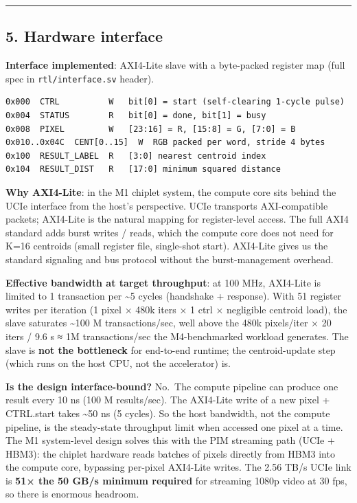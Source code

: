 \documentclass[
  10pt,
]{article}
\begin{document}
\begin{center}\rule{0.5\linewidth}{0.5pt}\end{center}

\hypertarget{hardware-interface}{%
\subsection{5. Hardware interface}\label{hardware-interface}}

\textbf{Interface implemented}: AXI4-Lite slave with a byte-packed
register map (full spec in \texttt{rtl/interface.sv} header).

\begin{verbatim}
0x000  CTRL          W   bit[0] = start (self-clearing 1-cycle pulse)
0x004  STATUS        R   bit[0] = done, bit[1] = busy
0x008  PIXEL         W   [23:16] = R, [15:8] = G, [7:0] = B
0x010..0x04C  CENT[0..15]  W  RGB packed per word, stride 4 bytes
0x100  RESULT_LABEL  R   [3:0] nearest centroid index
0x104  RESULT_DIST   R   [17:0] minimum squared distance
\end{verbatim}

\textbf{Why AXI4-Lite}: in the M1 chiplet system, the compute core sits
behind the UCIe interface from the host's perspective. UCIe transports
AXI-compatible packets; AXI4-Lite is the natural mapping for
register-level access. The full AXI4 standard adds burst writes / reads,
which the compute core does not need for K=16 centroids (small register
file, single-shot start). AXI4-Lite gives us the standard signaling and
bus protocol without the burst-management overhead.

\textbf{Effective bandwidth at target throughput}: at 100 MHz, AXI4-Lite
is limited to 1 transaction per \textasciitilde5 cycles (handshake +
response). With 51 register writes per iteration (1 pixel × 480k iters ×
1 ctrl × negligible centroid load), the slave saturates
\textasciitilde100 M transactions/sec, well above the 480k pixels/iter ×
20 iters / 9.6 s ≈ 1M transactions/sec the M4-benchmarked workload
generates. The slave is \textbf{not the bottleneck} for end-to-end
runtime; the centroid-update step (which runs on the host CPU, not the
accelerator) is.

\textbf{Is the design interface-bound?} No.~The compute pipeline can
produce one result every 10 ns (100 M results/sec). The AXI4-Lite write
of a new pixel + CTRL.start takes \textasciitilde50 ns (5 cycles). So
the host bandwidth, not the compute pipeline, is the steady-state
throughput limit when accessed one pixel at a time. The M1 system-level
design solves this with the PIM streaming path (UCIe + HBM3): the
chiplet hardware reads batches of pixels directly from HBM3 into the
compute core, bypassing per-pixel AXI4-Lite writes. The 2.56 TB/s UCIe
link is \textbf{51× the 50 GB/s minimum required} for streaming 1080p
video at 30 fps, so there is enormous headroom.
\end{document}
